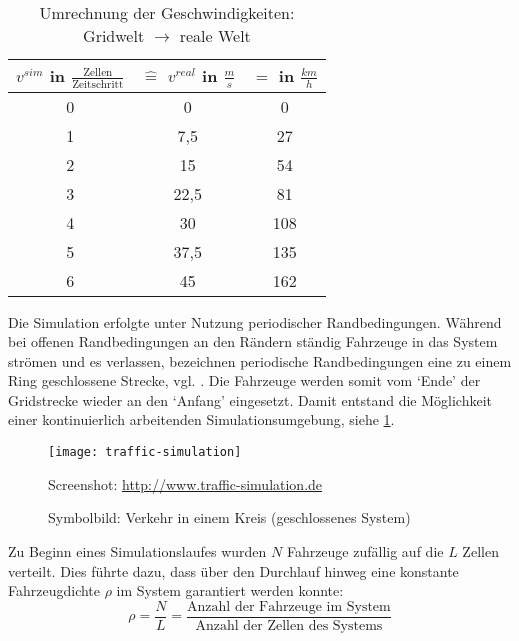 \begin{table}[ht]
\begin{center}
\setlength{\tabcolsep}{0.5em} %
{\renewcommand{\arraystretch}{1.2}%
\begin{tabular}{| c | c | c |}
\hline 
$v^{sim}$ in $\frac{\text{Zellen}}{\text{Zeitschritt}}$ & $\widehat{=}$ $v^{real}$ in $\frac{m}{s}$ & $=$ in $\frac{km}{h}$ \\ \hline 
0 & 0 & 0 \\ \hline
1 & 7,5 & 27 \\ \hline
2 & 15 & 54 \\ \hline
3 & 22,5 & 81 \\ \hline
4 & 30 & 108 \\ \hline
5 & 37,5 & 135 \\ \hline
6 & 45 & 162 \\ \hline
\end{tabular}
}
\caption{Umrechnung der Geschwindigkeiten: Gridwelt $\rightarrow$ reale Welt}
\end{center}
\label{tab:umrechnung-zelle-kmh}
\end{table}

Die Simulation erfolgte unter Nutzung periodischer Randbedingungen. 
Während bei offenen Randbedingungen an den Rändern ständig Fahrzeuge in das System strömen und es verlassen, bezeichnen periodische Randbedingungen eine zu einem Ring geschlossene Strecke, vgl. \cite[S. 6]{spahn-da}.
Die Fahrzeuge werden somit vom \enquote*{Ende} der Gridstrecke wieder an den \enquote*{Anfang} eingesetzt. 
Damit entstand die Möglichkeit einer kontinuierlich arbeitenden Simulationsumgebung, siehe \cref{figure:traffic-simulation}.

\begin{figure}[hptb]
 \centering
 \texttt{[image: traffic-simulation]}
 \caption[Darstellung des Verkehrs in einem geschlossenen System]
 		{Symbolbild: Verkehr in einem Kreis (geschlossenes System)}{\footnotesize Screenshot: \url{http://www.traffic-simulation.de}}
 \label{figure:traffic-simulation}
\end{figure} 

Zu Beginn eines Simulationslaufes wurden $N$ Fahrzeuge zufällig auf die $L$ Zellen verteilt.
Dies führte dazu, dass über den Durchlauf hinweg eine konstante Fahrzeugdichte $\rho$ im System garantiert werden konnte:
\begin{equation}
\rho = \dfrac{N}{L} = \dfrac{\text{Anzahl der Fahrzeuge im System}}{\text{Anzahl der Zellen des Systems}}
\nonumber
\end{equation}



